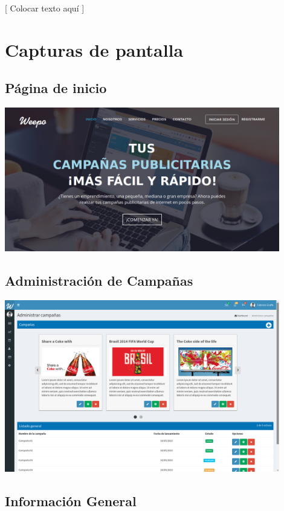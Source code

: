 \documentclass[oneside]{book}
\begin{document}
	[ Colocar texto aquí ]
\bigskip


\section{Capturas de pantalla}

\subsection{P\'{a}gina de inicio}

\includegraphics[width=0.9\textwidth]{images/index.png}
\medskip

\subsection{Administraci\'{o}n de Campañas}

\includegraphics[width=0.9\textwidth]{images/adminCampanias.png}

\medskip
\subsection{Informaci\'{o}n General}
\end{document}
